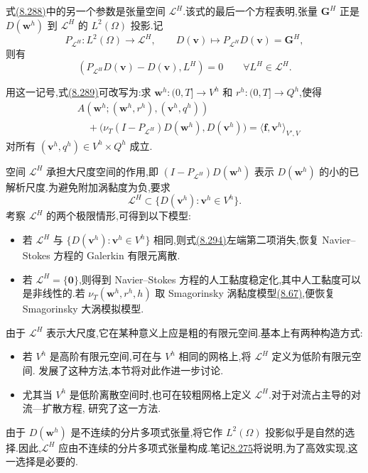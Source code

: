 \begin{note}[大尺度投影空间的选取]
\label{note:vms-coarse-projection-large-space}
式\hyperref[eq:vms-coarse-projection-three-scale-method]{(8.288)}中的另一个参数是张量空间 $\mathcal L^H$.该式的最后一个方程表明,张量 $\bm G^H$ 正是 $D(\bm w^h)$ 到 $\mathcal L^H$ 的 $L^2(\Omega)$ 投影.记
\[
 P_{\mathcal L^H}:L^2(\Omega)\to\mathcal L^H,\qquad
 D(\bm v)\mapsto P_{\mathcal L^H}D(\bm v)=\bm G^H,
\]
则有
\begin{equation}\label{eq:vms-coarse-projection-orthogonality}
 (P_{\mathcal L^H}D(\bm v)-D(\bm v),L^H)=0
 \qquad\forall L^H\in\mathcal L^H.
\end{equation}

用这一记号,式\hyperref[eq:vms-coarse-projection-short-form]{(8.289)}可改写为:求
$\bm w^h:(0,T]\to V^h$ 和 $r^h:(0,T]\to Q^h$,使得
\begin{equation}\label{eq:vms-coarse-projection-projected-form}
\begin{aligned}
 &A(\bm w^h;(\bm w^h,r^h),(\bm v^h,q^h))\\
 &\quad+
 \bigl(\nu_T(I-P_{\mathcal L^H})D(\bm w^h),D(\bm v^h)\bigr)
 =\langle\bm f,\bm v^h\rangle_{V',V}
\end{aligned}
\end{equation}
对所有 $(\bm v^h,q^h)\in V^h\times Q^h$ 成立.

空间 $\mathcal L^H$ 承担大尺度空间的作用,即
$(I-P_{\mathcal L^H})D(\bm w^h)$ 表示 $D(\bm w^h)$ 的小的已解析尺度.为避免附加涡黏度为负,要求
\[
 \mathcal L^H\subset\{D(\bm v^h):\bm v^h\in V^h\}.
\]
考察 $\mathcal L^H$ 的两个极限情形,可得到以下模型:
\begin{itemize}
 \item 若 $\mathcal L^H$ 与 $\{D(\bm v^h):\bm v^h\in V^h\}$ 相同,则式\hyperref[eq:vms-coarse-projection-projected-form]{(8.294)}左端第二项消失,恢复 Navier--Stokes 方程的 Galerkin 有限元离散.
 \item 若 $\mathcal L^H=\{\bm 0\}$,则得到 Navier--Stokes 方程的人工黏度稳定化,其中人工黏度可以是非线性的.若 $\nu_T(\bm w^h,r^h,h)$ 取 Smagorinsky 涡黏度模型\hyperref[eq:smagorinsky-filter-width]{(8.67)},便恢复 Smagorinsky 大涡模拟模型.
\end{itemize}

由于 $\mathcal L^H$ 表示大尺度,它在某种意义上应是粗的有限元空间.基本上有两种构造方式:
\begin{itemize}
 \item 若 $V^h$ 是高阶有限元空间,可在与 $V^h$ 相同的网格上,将 $\mathcal L^H$ 定义为低阶有限元空间.\textcite{JohnKaya2005} 发展了这种方法,本节将对此作进一步讨论.
 \item 尤其当 $V^h$ 是低阶离散空间时,也可在较粗网格上定义 $\mathcal L^H$.对于对流占主导的对流—扩散方程,\textcite{JohnKayaLayton2006b} 研究了这一方法.
\end{itemize}

由于 $D(\bm w^h)$ 是不连续的分片多项式张量,将它作 $L^2(\Omega)$ 投影似乎是自然的选择.因此,$\mathcal L^H$ 应由不连续的分片多项式张量构成.笔记\hyperref[note:vms-coarse-projection-implementation]{8.275}将说明,为了高效实现,这一选择是必要的.
\end{note}

